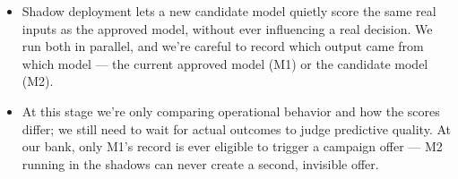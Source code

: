 \documentclass[11pt,a4paper]{article}
\begin{document}
\begin{examplebox}[title after break={SPOKEN SCRIPT --- slide 12 continued}]
\begin{itemize}
\item Shadow deployment lets a new candidate model quietly score the same real inputs as the approved model, without ever influencing a real decision. We run both in parallel, and we're careful to record which output came from which model — the current approved model (M1) or the candidate model (M2).
\item At this stage we're only comparing operational behavior and how the scores differ; we still need to wait for actual outcomes to judge predictive quality. At our bank, only M1's record is ever eligible to trigger a campaign offer — M2 running in the shadows can never create a second, invisible offer.
\end{itemize}
\end{examplebox}
\par\noindent{\scriptsize\textcolor{teal!60!black}{Reading anchor: Bass, §14.1.4 · Bank teaching application of the group release plan}}
\clearpage
\end{document}
